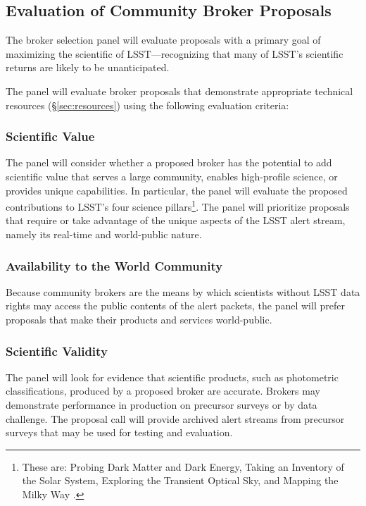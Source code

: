 \subsection{Evaluation of Community Broker Proposals} \label{sec:evaluation}

The broker selection panel will evaluate proposals with a primary goal of maximizing the scientific   of LSST---recognizing that many of LSST's scientific returns are likely to be unanticipated.

The panel will evaluate broker proposals that demonstrate appropriate technical resources (\S \ref{sec:resources}) using the following evaluation criteria:

\subsubsection{Scientific Value}

The panel will consider whether a proposed broker has the potential to add scientific value that serves a large community, enables high-profile science, or provides unique capabilities.
In particular, the panel will evaluate the proposed contributions to LSST's four science pillars\footnote{These are: Probing Dark Matter and Dark Energy, Taking an Inventory of the Solar System, Exploring the Transient Optical Sky, and Mapping the Milky Way .}.
The panel will prioritize proposals that require or take advantage of the unique aspects of the LSST alert stream, namely its real-time and world-public nature.

\subsubsection{Availability to the World Community}

Because community brokers are the means by which scientists without LSST data rights may access the public contents of the alert packets, the panel will prefer proposals that make their products and services world-public.

\subsubsection{Scientific Validity}

The panel will look for evidence that scientific products, such as photometric classifications, produced by a proposed broker are accurate.  
Brokers may demonstrate performance in production on precursor surveys or by data challenge.
The proposal call will provide archived alert streams from precursor surveys that may be used for testing and evaluation.

